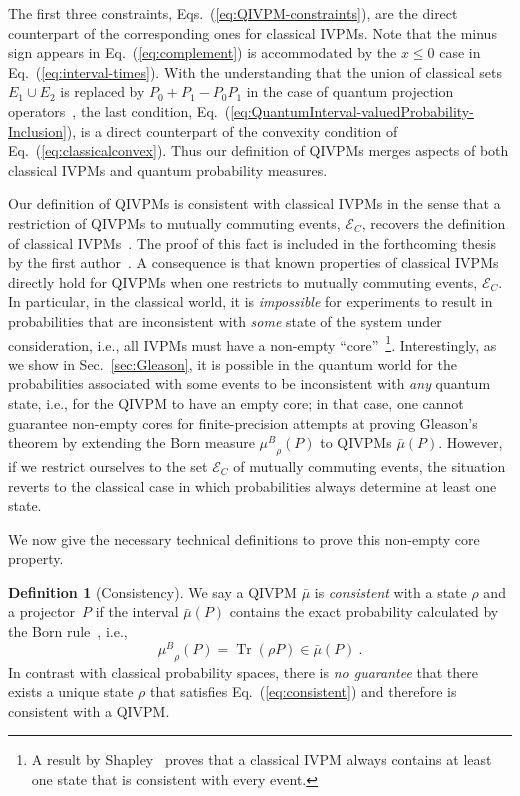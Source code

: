\documentclass[english,reprint, aps, prl,superscriptaddress, showpacs,
showkeys, longbibliography, amsmath, amssymb, floatfix]{revtex4-1}
\theoremstyle{plain}
\theoremstyle{definition}
\newtheorem{definition}{Definition}
\newcommand{\events}{\ensuremath{\mathcal{E}}}
\newcommand{\Tr}{\ensuremath{\mathop{\mathrm{Tr}}\nolimits}}
\newcommand{\muB}{\ensuremath{\mu^{B}}}
\newcommand{\eventsC}{\ensuremath{\events_{C}}}
\begin{document}
\noindent The first three constraints,
Eqs.~(\ref{eq:QIVPM-constraints}), are the direct counterpart of the
corresponding ones for classical IVPMs.  {\color{red}Note that the minus sign
appears in Eq.~(\ref{eq:complement}) is accommodated by the $x\le0$ case in
Eq.~(\ref{eq:interval-times}).}  With the understanding that
the union of classical sets $E_1\cup E_2$ is replaced by
$P_0+P_1-P_0P_1$ in the case of quantum projection
operators~\cite{Griffiths2003}, the last condition,
Eq.~(\ref{eq:QuantumInterval-valuedProbability-Inclusion}), is a
direct counterpart of the convexity condition of
Eq.~(\ref{eq:classicalconvex}). Thus our definition of QIVPMs merges
aspects of both classical IVPMs and quantum probability measures.

Our definition of QIVPMs is consistent with classical IVPMs in the
sense that a restriction of QIVPMs to mutually commuting events,
$\eventsC$, recovers the definition of classical
IVPMs~\cite{JamisonLodwick2004}. The proof of this fact is included in the
forthcoming thesis by the first author~\cite{TaiThesis2018}. A
consequence is that known properties of classical IVPMs
directly hold for QIVPMs when one restricts to mutually commuting
events, $\eventsC$. In particular, in the classical world, it is
\emph{impossible} for experiments to result in probabilities that are
inconsistent with \emph{some} state of the system under consideration,
i.e., all IVPMs must have a non-empty ``core''~\footnote{A result by
  Shapley~\cite{Shapley1971,GilboaSchmeidler1994,NgMoYeh1997,Grabisch2016}
  proves that a classical IVPM always contains at least one state that
  is consistent with every event.}. Interestingly, as we show in
Sec.~\ref{sec:Gleason}, it is possible in the quantum world for the
probabilities associated with some events to be inconsistent with
\emph{any} quantum state, i.e., for the QIVPM to have an empty core;
in that case, one cannot guarantee non-empty cores for finite-precision
attempts at proving Gleason's theorem by extending the Born measure
$\muB_{\rho}\left(P\right)$ to QIVPMs
$\bar{\mu}\left(P\right)$. However, if we restrict ourselves to the set
$\eventsC$ of mutually commuting {\color{red} events}, 
the situation reverts to the classical case in which
probabilities always determine at least one state.

We now give the necessary technical definitions to prove this
non-empty core property.
\begin{definition}[Consistency]\label{def:Consistency} We say a QIVPM
$\bar{\mu}$ is
\emph{consistent} with a state $\rho$ and a projector~$P$ if the
interval $\bar{\mu}(P)$ contains the exact probability calculated by
the Born rule~\cite{Born1983bibTeX,Mermin2007,Jaeger2007}, i.e.,
  \begin{equation}
  \muB_{\rho}\left(P\right) = \Tr\left(\rho
  P\right)\in\bar{\mu}\left(P\right)\ .\label{eq:consistent}
  \end{equation}
In contrast with classical probability spaces, there is \emph{no
guarantee} that there exists a unique state $\rho$ that satisfies
Eq.~(\ref{eq:consistent}) and therefore is consistent with a QIVPM.
\end{definition}
\end{document}

